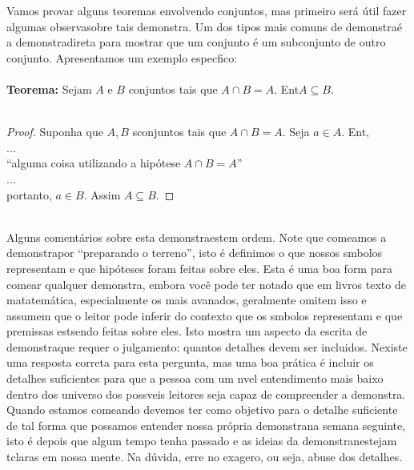 Vamos provar alguns teoremas envolvendo conjuntos, mas primeiro ser\'a \'util fazer algumas observa\coes sobre tais demonstra\cois. Um dos tipos mais comuns de demonstra\cao \'e a demonstra\cao direta para mostrar que um conjunto \'e um subconjunto de outro conjunto. Apresentamos um exemplo espec\ih fico:
\\
\\
{\bf Teorema:} Sejam $A$ e $B$ conjuntos tais que $A\cap B=A$. Ent\ao $A\subseteq B.$
\\
\\
\begin{proof} 
Suponha que $A,B$ s\ao conjuntos tais que $A\cap B=A$. Seja $a\in A.$ Ent\aoi,
\\
...
\\ 
``alguma coisa utilizando a hip\'otese  $A\cap B=A$''
\\
...
\\
portanto, $a\in B$. Assim $A\subseteq B.$
\end{proof}
\\ 

Alguns coment\'arios sobre esta demonstra\cao est\ao em ordem. Note que come\cc amos a demonstra\cao por ``preparando o terreno'', isto \'e definimos o que nossos s\ih mbolos representam e que hip\'oteses foram feitas sobre eles. Esta \'e uma boa form para come\cc ar qualquer demonstra\caoi, embora voc\^e pode ter notado que em livros texto de matatem\'atica, especialmente os mais avan\cc ados, geralmente omitem isso e assumem que o leitor pode inferir do contexto que os s\ih mbolos representam e que premissas est\ao sendo feitas sobre eles. Isto mostra um aspecto da escrita de demonstra\coes que requer o julgamento: quantos detalhes devem ser incluidos. N\ao existe uma resposta correta para esta pergunta, mas uma boa pr\'atica \'e incluir os detalhes suficientes para que a pessoa com um n\ih vel entendimento mais baixo dentro dos universo dos poss\ih veis leitores seja capaz de compreender a demonstra\caoi. Quando estamos come\cc ando devemos ter como objetivo para o detalhe suficiente de tal forma que possamos entender nossa pr\'opria demonstra\cao na semana seguinte, isto \'e depois que algum tempo tenha passado e as ideias da demonstra\cao n\ao estejam t\ao claras em nossa mente. Na d\'uvida, erre no exagero, ou seja, abuse dos detalhes.

